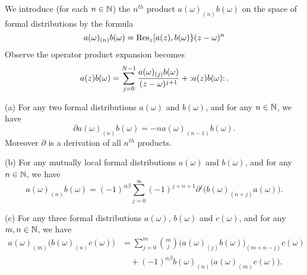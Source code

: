 \M
We introduce (for each $n\in\NN$) the $n^{th}$ product
$a(\omega)_{(n)}b(\omega)$ on the space of formal distributions by the
formula
\begin{equation}
a(\omega)_{(n)}b(\omega)=\Res[z]{\superb{a(z)}{b(\omega)}(z-\omega)^{n}}
\end{equation}
Observe the operator product expansion becomes
\begin{equation}
a(z)b(\omega)=\sum^{N-1}_{j=0}\frac{a(\omega)_{(j)}b(\omega)}{(z-\omega)^{j+1}}+\normOrd{a(z)b(\omega)}.
\end{equation}

(a) For any two formal distributions $a(\omega)$ and $b(\omega)$, and
for any $n\in\NN$, we have
\begin{equation}
\partial a(\omega)_{(n)}b(\omega)=-na(\omega)_{(n-1)}b(\omega).
\end{equation}
Moreover $\partial$ is a derivation of all $n^{th}$ products.

(b) For any mutually local formal distributions $a(\omega)$ and
$b(\omega)$, and for any $n\in\NN$, we have
\begin{equation}
a(\omega)_{(n)}b(\omega)=(-1)^{\alpha\beta}\sum^{\infty}_{j=0}(-1)^{j+n+1}\partial^{j}\bigl(b(\omega)_{(n+j)}a(\omega)\bigr).
\end{equation}

(c) For any three formal distributions $a(\omega)$, $b(\omega)$ and
$c(\omega)$, and for any $m,n\in\NN$, we have
\begin{equation}
\begin{split}
a(\omega)_{(m)}\bigl(b(\omega)_{(n)}c(\omega)\bigr)
&=\sum^{m}_{j=0}{m\choose j}\bigl(a(\omega)_{(j)}b(\omega)\bigr)_{(m+n-j)}c(\omega)\\
&\quad+(-1)^{\alpha\beta}b(\omega)_{(n)}\bigl(a(\omega)_{(m)}c(\omega)\bigr).
\end{split}
\end{equation}

